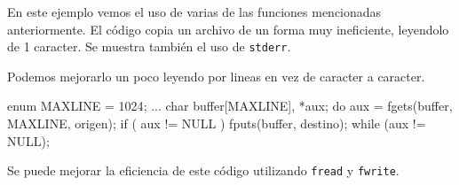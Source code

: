En este ejemplo vemos el uso de varias de las funciones mencionadas
anteriormente. El código copia un archivo de un forma muy ineficiente,
leyendolo de 1 caracter. Se muestra también el uso de \lstinline!stderr!.

Podemos mejorarlo un poco leyendo por lineas en vez de caracter a caracter.

\begin{codigo-c-plano}
enum {MAXLINE = 1024};
...
	char buffer[MAXLINE], *aux;
	do {
		aux = fgets(buffer, MAXLINE, origen);
		if ( aux != NULL ) {
			fputs(buffer, destino);
		}
	} while (aux != NULL);
\end{codigo-c-plano}

Se puede mejorar la eficiencia de este código utilizando \lstinline!fread! y
\lstinline!fwrite!.


